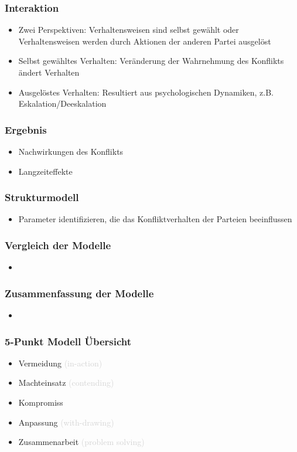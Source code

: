 \documentclass[12pt,a4paper]{beamer}
\begin{document}
\begin{frame}
	\frametitle{Interaktion}
	\begin{itemize}
		\item Zwei Perspektiven: Verhaltensweisen sind selbst gewählt oder Verhaltensweisen werden durch Aktionen der anderen Partei ausgelöst
		\item Selbst gewähltes Verhalten: Veränderung der Wahrnehmung des Konflikts ändert Verhalten
		\item Ausgelöstes Verhalten: Resultiert aus psychologischen Dynamiken, z.B. Eskalation/Deeskalation
	\end{itemize}
\end{frame}

\begin{frame}
	\frametitle{Ergebnis}
	\begin{itemize}
		\item Nachwirkungen des Konflikts
		\item Langzeiteffekte 
	\end{itemize}
\end{frame}

\begin{frame}
	\frametitle{Strukturmodell}
	\begin{itemize}
		\item Parameter identifizieren, die das Konfliktverhalten der Parteien beeinflussen 
	\end{itemize}
\end{frame}


\begin{frame}
	\frametitle{Vergleich der Modelle}
	\begin{itemize}
		\item 
	\end{itemize}
\end{frame}

\begin{frame}
	\frametitle{Zusammenfassung der Modelle}
	\begin{itemize}
		\item 
	\end{itemize}
\end{frame}

\begin{frame}
	\frametitle{5-Punkt Modell \"Ubersicht}		
	\begin{itemize}
		\item Vermeidung \textcolor{lightgray}{(in-action)}			%
		\item Machteinsatz \textcolor{lightgray}{(contending)}			%
		\item Kompromiss									%
		\item Anpassung \textcolor{lightgray}{(with-drawing)}			%
		\item Zusammenarbeit \textcolor{lightgray}{(problem solving)}	%
	\end{itemize}
\end{frame}


\end{document}
